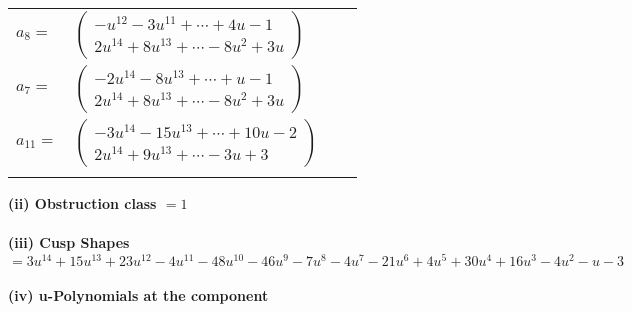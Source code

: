 \documentclass[1p]{elsarticle_modified}
\theoremstyle{definition}
\begin{document}
\begin{tabular}{m{7pt} m{180pt} m{7pt} m{180pt} }
\flushright $a_{8}=$&$\begin{pmatrix}- u^{12}-3 u^{11}+\cdots+4 u-1\\2 u^{14}+8 u^{13}+\cdots-8 u^2+3 u\end{pmatrix}$ \\
\flushright $a_{7}=$&$\begin{pmatrix}-2 u^{14}-8 u^{13}+\cdots+u-1\\2 u^{14}+8 u^{13}+\cdots-8 u^2+3 u\end{pmatrix}$ \\
\flushright $a_{11}=$&$\begin{pmatrix}-3 u^{14}-15 u^{13}+\cdots+10 u-2\\2 u^{14}+9 u^{13}+\cdots-3 u+3\end{pmatrix}$\\&\end{tabular}
\flushleft \textbf{(ii) Obstruction class $= 1$}\\~\\
\flushleft \textbf{(iii) Cusp Shapes $= 3 u^{14}+15 u^{13}+23 u^{12}-4 u^{11}-48 u^{10}-46 u^9-7 u^8-4 u^7-21 u^6+4 u^5+30 u^4+16 u^3-4 u^2- u-3$}\\~\\
\newpage\renewcommand{\arraystretch}{1}
\flushleft \textbf{(iv) u-Polynomials at the component}\newline \\
\end{document}
